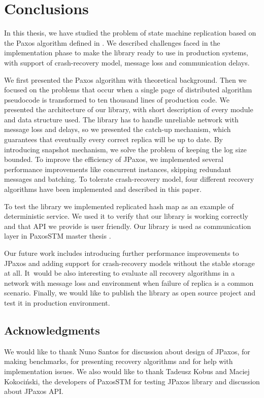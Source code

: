 \chapter{Conclusions}

In this thesis, we have studied the problem of state machine replication based
on the Paxos algorithm defined in \cite{Lam98}. We described challenges faced in
the implementation phase to make the library ready to use in production systems,
with support of crash-recovery model, message loss and communication delays.

We first presented the Paxos algorithm with theoretical background. Then we
focused on the problems that occur when a single page of distributed algorithm pseudocode 
is transformed to ten thousand lines of production code. We presented
the architecture of our library, with short description of every module and data
structure used. The library has to handle unreliable network with message
loss and delays, so we presented the catch-up mechanism, which guarantees that
eventually every correct replica will be up to date. By introducing snapshot
mechanism, we solve the problem of keeping the log size bounded. To improve the efficiency of JPaxos, we implemented several performance improvements like concurrent
instances, skipping redundant messages and batching. To tolerate crash-recovery
model, four different recovery algorithms have been implemented and described in
this paper.

To test the library we implemented replicated hash map as an example of
deterministic service. We used it to verify that our library is working
correctly and that API we provide is user friendly. Our library is used as 
communication layer in PaxosSTM master thesis \cite{Tad10}.

Our future work includes introducing further performance improvements to JPaxos and
adding support for crash-recovery models without the stable storage at all. It~would be also interesting to evaluate all recovery algorithms in a network with
message loss and environment when failure of replica is a common scenario.
Finally, we would like to publish the library as open source project and test it
in production environment.

\section*{Acknowledgments}

\noindent We would like to thank Nuno Santos for discussion about design of JPaxos, for making benchmarks, for presenting recovery algorithms and for help with implementation issues. We also would like to thank Tadeusz Kobus and Maciej Kokociński, the developers of PaxosSTM for testing JPaxos library and discussion about JPaxos API.

\cleardoublepage
